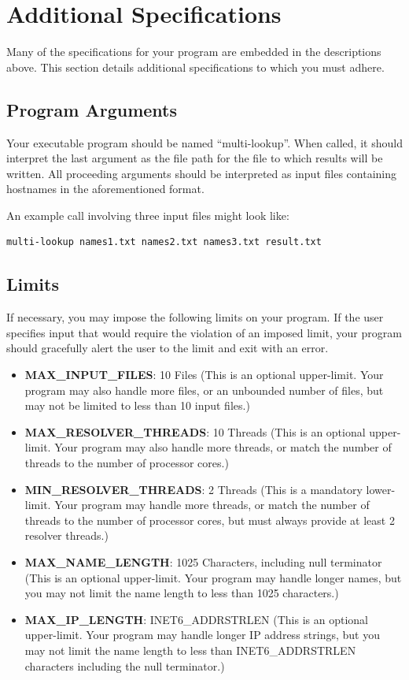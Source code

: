 \documentclass[12pt]{article}
\begin{document}
\section{Additional Specifications}

Many of the specifications for your program are embedded in the
descriptions above. This section details additional specifications to
which you must adhere.

\subsection{Program Arguments}
Your executable program should be named ``multi-lookup''.
When called, it should interpret the last argument as the file path
for the file to which results will be written. All proceeding
arguments should be interpreted as input files containing hostnames in
the aforementioned format.

An example call involving three input files might look like:

\begin{verbatim}
multi-lookup names1.txt names2.txt names3.txt result.txt
\end{verbatim}

\subsection{Limits}
If necessary, you may impose the following limits on your
program. If the user specifies input that would require the violation
of an imposed limit, your program should gracefully alert the user to
the limit and exit with an error.

\begin{itemize}
\item {\bf MAX\_INPUT\_FILES}: 10 Files (This is an optional
  upper-limit. Your program may also handle more files, or an
  unbounded number of files, but may not be limited to less than
  10 input files.)
\item {\bf MAX\_RESOLVER\_THREADS}: 10 Threads (This is an optional
  upper-limit. Your program may also handle more threads, or match
  the number of threads to the number of processor cores.)
\item {\bf MIN\_RESOLVER\_THREADS}: 2 Threads (This is a mandatory
  lower-limit. Your program may handle more threads, or match
  the number of threads to the number of processor cores, but must
  always provide at least 2 resolver threads.)
\item {\bf MAX\_NAME\_LENGTH}: 1025 Characters, including null
  terminator (This is an optional upper-limit. Your program may handle
  longer names, but you may not limit the name length to less than
  1025 characters.)
\item {\bf MAX\_IP\_LENGTH}: INET6\_ADDRSTRLEN (This is an optional
  upper-limit. Your program may handle longer IP address strings, but
  you may not limit the name length to less than INET6\_ADDRSTRLEN
  characters including the null terminator.) 
\end{itemize}
\end{document}
